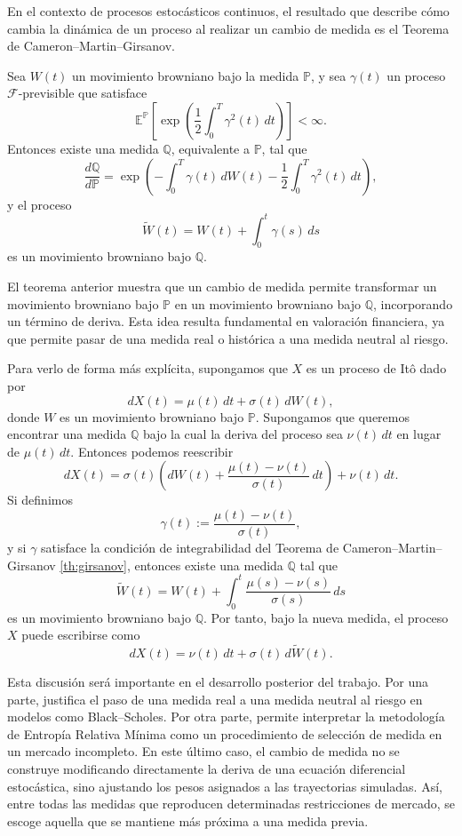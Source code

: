En el contexto de procesos estocásticos continuos, el resultado que describe cómo cambia la dinámica de un proceso al realizar un cambio de medida es el Teorema de Cameron--Martin--Girsanov.

\begin{theorem}
\label{th:girsanov}
Sea \(W(t)\) un movimiento browniano bajo la medida \(\mathbb{P}\), y sea \(\gamma(t)\) un proceso \(\mathcal{F}\)-previsible que satisface
\[
\mathbb{E}^{\mathbb{P}}
\left[
\exp\left(
\frac{1}{2}\int_0^T \gamma^2(t)\,dt
\right)
\right]
<\infty.
\]
Entonces existe una medida \(\mathbb{Q}\), equivalente a \(\mathbb{P}\), tal que
\[
\frac{d\mathbb{Q}}{d\mathbb{P}}
=
\exp\left(
-\int_0^T \gamma(t)\,dW(t)
-
\frac{1}{2}\int_0^T \gamma^2(t)\,dt
\right),
\]
y el proceso
\[
\widetilde{W}(t)
=
W(t)
+
\int_0^t \gamma(s)\,ds
\]
es un movimiento browniano bajo \(\mathbb{Q}\).
\end{theorem}

El teorema anterior muestra que un cambio de medida permite transformar un movimiento browniano bajo \(\mathbb{P}\) en un movimiento browniano bajo \(\mathbb{Q}\), incorporando un término de deriva. Esta idea resulta fundamental en valoración financiera, ya que permite pasar de una medida real o histórica a una medida neutral al riesgo.

Para verlo de forma más explícita, supongamos que \(X\) es un proceso de Itô dado por
\[
dX(t)
=
\mu(t)\,dt+\sigma(t)\,dW(t),
\]
donde \(W\) es un movimiento browniano bajo \(\mathbb{P}\). Supongamos que queremos encontrar una medida \(\mathbb{Q}\) bajo la cual la deriva del proceso sea \(\nu(t)\,dt\) en lugar de \(\mu(t)\,dt\). Entonces podemos reescribir
\[
dX(t)
=
\sigma(t)
\left(
dW(t)
+
\frac{\mu(t)-\nu(t)}{\sigma(t)}\,dt
\right)
+
\nu(t)\,dt.
\]
Si definimos
\[
\gamma(t)
:=
\frac{\mu(t)-\nu(t)}{\sigma(t)},
\]
y si \(\gamma\) satisface la condición de integrabilidad del Teorema de Cameron--Martin--Girsanov \ref{th:girsanov}, entonces existe una medida \(\mathbb{Q}\) tal que
\[
\widetilde{W}(t)
=
W(t)
+
\int_0^t
\frac{\mu(s)-\nu(s)}{\sigma(s)}\,ds
\]
es un movimiento browniano bajo \(\mathbb{Q}\). Por tanto, bajo la nueva medida, el proceso \(X\) puede escribirse como
\[
dX(t)
=
\nu(t)\,dt+\sigma(t)\,d\widetilde{W}(t).
\]

Esta discusión será importante en el desarrollo posterior del trabajo. Por una parte, justifica el paso de una medida real a una medida neutral al riesgo en modelos como Black--Scholes. Por otra parte, permite interpretar la metodología de Entropía Relativa Mínima como un procedimiento de selección de medida en un mercado incompleto. En este último caso, el cambio de medida no se construye modificando directamente la deriva de una ecuación diferencial estocástica, sino ajustando los pesos asignados a las trayectorias simuladas. Así, entre todas las medidas que reproducen determinadas restricciones de mercado, se escoge aquella que se mantiene más próxima a una medida previa.

